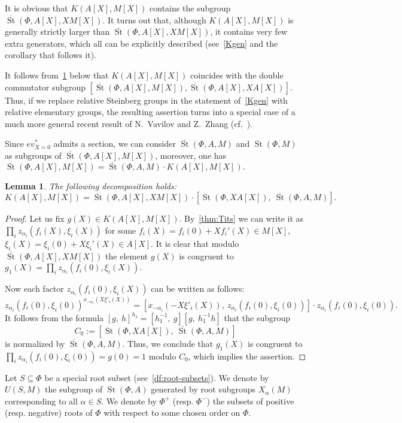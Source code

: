 \documentclass[oneside, 8pt]{amsart}
\newtheorem{lemma}{Lemma}
\theoremstyle{remark}
\theoremstyle{definition}
\numberwithin{lemma}{section}
\numberwithin{prop}{section}
\numberwithin{corollary}{section}
\numberwithin{externaltheorem}{section}
\DeclareMathOperator{\St}{St}
\numberwithin{equation}{section}
\begin{document}
It is obvious that $K(A[X], M[X])$ contains the subgroup $\overline{\St}(\Phi, A[X], XM[X])$.
It turns out that, although $K(A[X], M[X])$ is generally strictly larger than $\overline{\St}(\Phi, A[X], XM[X])$,
 it contains very few extra generators, which all can be explicitly described (see~\cref{Kgen} and the corollary that follows it). 

It follows from~\cref{Kdecomp1} below that $K(A[X], M[X])$ coincides with the double commutator subgroup $[\overline{\St}(\Phi, A[X], M[X]), \overline{\St}(\Phi, A[X], XA[X])].$ Thus, if we replace relative Steinberg groups in the statement of~\cref{Kgen} with relative elementary groups, the resulting assertion turns into a special case of a much more general recent result of N.~Vavilov and Z.~Zhang (cf.~\cite[Theorem~1]{VZ18}).

Since $ev_{X=0}^*$ admits a section, we can consider $\overline{\St}(\Phi, A, M)$ and $\St(\Phi, M)$ as subgroups of $\overline{\St}(\Phi, A[X], M[X])$,
 moreover, one has $\overline{\St}(\Phi, A[X], M[X]) = \overline{\St}(\Phi, A, M) \cdot K(A[X], M[X]).$
\begin{lemma} \label{Kdecomp1} The following decomposition holds:
 \[ K(A[X], M[X]) = \overline{\St}(\Phi, A[X], XM[X]) \cdot \left[\St(\Phi, XA[X]),\ \overline{\St}(\Phi, A, M)\right].\] \end{lemma}
\begin{proof} Let us fix $g(X) \in K(A[X], M[X])$. By~\cref{thm:Tits} we can write it as $\prod_i z_{\alpha_i}(f_i(X), \xi_i(X))$ for some $f_i(X) = f_i(0) + Xf_i'(X) \in M[X]$, $\xi_i(X) = \xi_i(0) + X\xi_i'(X) \in A[X]$.
 It is clear that modulo $\overline{\St}(\Phi, A[X], XM[X])$ the element $g(X)$ is congruent to $g_1(X) = \prod_i z_{\alpha_i}(f_i(0), \xi_i(X)).$ 
 
 Now each factor $z_{\alpha_i}(f_i(0), \xi_i(X))$ can be written as follows:
 \[z_{\alpha_i}(f_i(0), \xi_i(0))^{x_{-\alpha_i}(X\xi'_i(X))} = [x_{-\alpha_i}(-X\xi'_i(X)),\ z_{\alpha_i}(f_i(0), \xi_i(0))] \cdot z_{\alpha_i}(f_i(0), \xi_i(0)).\]
 It follows from the formula $[g,\ h]^{h_1} = [h_1^{-1},\ g][g,\ h_1^{-1}h]$ that the subgroup \[C_0 := \left[\St(\Phi, XA[X]),\ \overline{\St}(\Phi, A, M)\right]\] is normalized by $\overline{\St}(\Phi, A, M)$. Thus, we conclude that $g_1(X)$ is congruent to $\prod_i z_{\alpha_i}(f_i(0), \xi_i(0)) = g(0) = 1$ modulo $C_0$,
 which implies the assertion. \qedhere \end{proof}

Let $S \subseteq \Phi$ be a special root subset (see~\cref{df:root-subsets}). We denote by $U(S, M)$ the subgroup of $\St(\Phi, A)$ generated by root subgroups $X_\alpha(M)$ corresponding to all $\alpha \in S$. We denote by $\Phi^+$ (resp. $\Phi^-$) the subsets of positive (resp. negative) roots of $\Phi$ with respect to some chosen order on $\Phi$.
 
\end{document}
